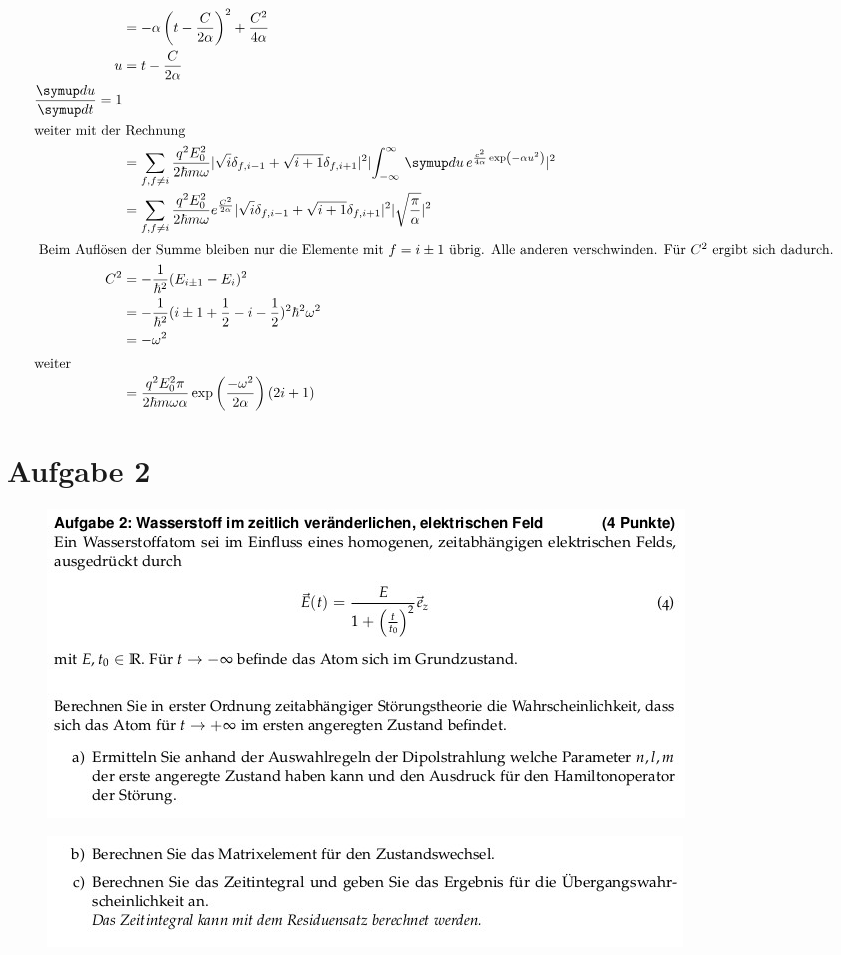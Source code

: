 \begin{align}
    &= - \alpha \left( t- \frac{C}{2 \alpha} \right)^2 + \frac{C^2}{4 \alpha}\\
    u  &= t-\frac{C}{2 \alpha}\\
    \frac{\dif{u}}{\dif{t}}=1\\
    \intertext{weiter mit der Rechnung}
    &= \sum _{f, f \ne i} \frac{q^2 E_0^2}{2 \hbar m \omega} \abs{\sqrt{i} \delta _{f,i-1} + \sqrt{i+1} \delta _{f,i+1} }^2 \abs{\int_{-\infty}^{\infty} \,\dif{u} e^{\frac{c^2}{4\alpha} \exp (-\alpha u^2) } }^2\\
    &= \sum _{f, f \ne i} \frac{q^2 E_0^2}{2 \hbar m \omega} e^{\frac{C^2}{2\alpha}} \abs{\sqrt{i} \delta _{f,i-1} + \sqrt{i+1} \delta _{f,i+1} }^2 \abs{\sqrt{\frac{\pi}{\alpha}}}^2\\
    \intertext{
        Beim Auflösen der Summe bleiben nur die Elemente mit $f=i\pm 1$ übrig. Alle
        anderen verschwinden. Für $C^2$ ergibt sich dadurch.
    }
    C^2 &= -\frac{1}{\hbar ^2} (E_{i\pm 1} - E_i)^2 \\
    &= -\frac{1}{\hbar ^2} (i\pm 1 + \frac{1}{2}-i-\frac{1}{2} )^2 \hbar ^2 \omega ^2\\
    &= -\omega ^2\\
    \intertext{weiter}
    &= \frac{q^2 E_0^2 \pi}{2 \hbar m \omega \alpha} \exp \left(\frac{- \omega ^2}{2\alpha}\right) (2i+1)
\end{align}

\section{Aufgabe 2}
\begin{figure}[H]
    \centering
    \includegraphics[width=\textwidth]{images/ex2a.jpg}
\end{figure}
\begin{figure}[H]
    \centering
    \includegraphics[width=\textwidth]{images/ex2b.jpg}
\end{figure}
